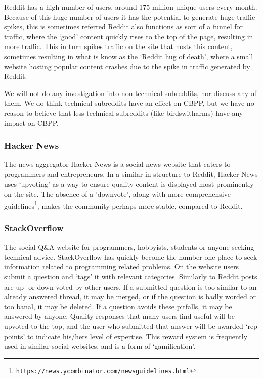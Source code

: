 \documentclass[a4paper,11pt]{article} %
\begin{document}
Reddit has a high number of users, around 175 million
unique users every month. Because of this huge number of users it has 
the potential to generate huge traffic spikes, this is sometimes referred
Reddit also functions as sort of a funnel for traffic, where the ‘good’
content quickly rises to the top of the page, resulting in more
traffic. This in turn spikes traffic on the site that hosts this content,
sometimes resulting in what is know as the ‘Reddit hug of death’, where a
small website hosting popular content crashes due to the spike in traffic
generated by Reddit. %


We will not do any investigation into non-technical subreddits, nor discuss
any of them. We do think technical subreddits have an effect on CBPP, but we
have no reason to believe that less technical subreddits (like
birdswitharms) have any impact on CBPP.

\subsubsection*{Hacker News}
The news aggregator Hacker News is a social news website that caters to
programmers and entrepreneurs. In a similar in structure to Reddit, Hacker
News uses ‘upvoting’ as a way to ensure quality content is displayed most
prominently on the site. The absence of a 'downvote', along with more
comprehensive guidelines\footnote{\texttt{https://news.ycombinator.com/newsguidelines.html}},
makes the community perhaps more stable, compared to Reddit.


\subsubsection*{StackOverflow}

The social Q\&A website for programmers, hobbyists, students or anyone
seeking technical advice. StackOverflow has quickly become the number one
place to seek information related to programming related problems. On the
website users submit a question and ‘tags’ it with relevant categories.
Similarly to Reddit posts are up- or down-voted by other users. If a
submitted question is too similar to an already answered thread, it may be
merged, or if the question is badly worded or too banal, it may be
deleted. If a question avoids these pitfalls, it may be answered by
anyone. Quality responses that many users find useful will be upvoted to the
top, and the user who submitted that answer will be awarded ‘rep points’ to
indicate his/hers level of expertise. This reward system is frequently used
in similar social websites, and is a form of ‘gamification’.
\end{document}
